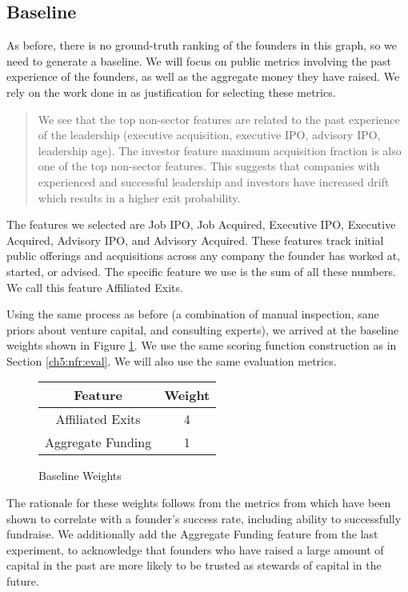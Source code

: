 \subsection{Baseline}

As before, there is no ground-truth ranking of the founders in this graph, so we need to generate a baseline. We will focus on public metrics involving the past experience of the founders, as well as the aggregate money they have raised. We rely on the work done in \cite{2017arXiv170604229H} as justification for selecting these metrics.

\begin{quote}
We see that the top non-sector features are related to the past experience of the leadership (executive acquisition, executive IPO, advisory IPO, leadership age). The investor feature maximum acquisition fraction is also one of the top non-sector features. This suggests that companies with experienced and successful leadership and investors have increased drift which results in a higher exit probability.
\end{quote}

The features we selected are Job IPO, Job Acquired, Executive IPO, Executive Acquired, Advisory IPO, and Advisory Acquired. These features track initial public offerings and acquisitions across any company the founder has worked at, started, or advised. The specific feature we use is the sum of all these numbers. We call this feature Affiliated Exits.

Using the same process as before (a combination of manual inspection, sane priors about venture capital, and consulting experts), we arrived at the baseline weights shown in Figure \ref{fig:fri:baseline:weights}. We use the same scoring function construction as in Section \ref{ch5:nfr:eval}. We will also use the same evaluation metrics.

\begin{figure}[ht]
\begin{tabular}{c | c}
\textbf{Feature}   & \textbf{Weight} \\\hline
Affiliated Exits   & 4 \\\hline
Aggregate Funding  & 1
\end{tabular}
\centering
\caption{Baseline Weights}
\label{fig:fri:baseline:weights}
\end{figure}

The rationale for these weights follows from the metrics from \cite{2017arXiv170604229H} which have been shown to correlate with a founder's success rate, including ability to successfully fundraise. We additionally add the Aggregate Funding feature from the last experiment, to acknowledge that founders who have raised a large amount of capital in the past are more likely to be trusted as stewards of capital in the future.

